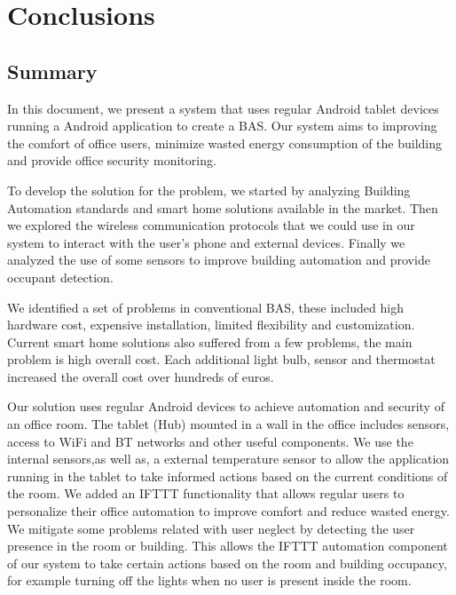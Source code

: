 \chapter{Conclusions}
\label{chapter:conclusion}

\section{Summary}
\label{section:summary}


In this document, we present a system that uses regular Android tablet devices running a Android application to create a \ac{BAS}. Our system aims to improving the comfort of office users, minimize wasted energy consumption of the building and provide office security monitoring. 

To develop the solution for the problem, we started by analyzing Building Automation standards and smart home solutions available in the market. Then we explored the wireless communication protocols that we could use in our system to interact with the user's phone and external devices. Finally we analyzed the use of some sensors to improve building automation and provide occupant detection. 

We identified a set of problems in conventional \ac{BAS}, these included high hardware cost, expensive installation, limited flexibility and customization.
Current smart home solutions also suffered from a few problems, the main problem is high overall cost. Each additional light bulb, sensor and thermostat increased the overall cost over hundreds of euros.

Our solution uses regular Android devices to achieve automation and security of an office room. The tablet (Hub) mounted in a wall in the office includes sensors, access to \ac{WiFi} and \ac{BT} networks and other useful components. We use the internal sensors,as well as, a external temperature sensor to allow the application running in the tablet to take informed actions based on the current conditions of the room. 
We added an \ac{IFTTT} functionality that allows regular users to personalize their office automation to improve comfort and reduce wasted energy. We mitigate some problems related with user neglect by detecting the user presence in the room or building. This allows the \ac{IFTTT} automation component of our system to take certain actions based on the room and building occupancy, for example turning off the lights when no user is present inside the room.


